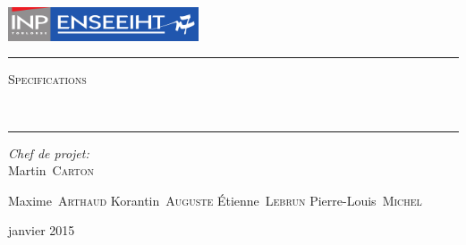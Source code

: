 \begin{titlepage}
  \begin{center}
    \includegraphics[height=1cm]{LogoEnseeiht}\\\vspace{1cm}
    \hrule\vspace{0.5cm}
    \textsc{\Large Specifications}
    \\\vspace{0.5cm}

    \textbf{\huge\thetitle}
    \\\vspace{0.4cm}
    \hrule\vspace{2cm}

    \begin{minipage}{0.4\textwidth}
      \begin{flushleft} \large
        \emph{Chef de projet:}\\\hspace{1cm}Martin~\textsc{Carton}
      \end{flushleft}
    \end{minipage}
    \begin{minipage}{0.4\textwidth}
      \begin{flushright} \large
          Maxime~\textsc{Arthaud}
          Korantin~\textsc{Auguste}
          Étienne~\textsc{Lebrun}
          Pierre-Louis~\textsc{Michel}
      \end{flushright}
    \end{minipage}

    \vfill
    {\large janvier 2015}
  \end{center}
\end{titlepage}

